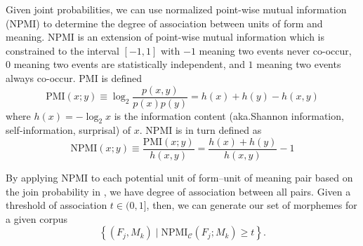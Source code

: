 

Given joint probabilities, we can use normalized point-wise mutual information (NPMI)  to determine the degree of association between units of form and meaning.
NPMI is an extension of point-wise mutual information which is constrained to the interval $[-1,1]$
  with $-1$ meaning two events never co-occur, $0$ meaning two events are statistically independent, and $1$ meaning two events always co-occur.
PMI is defined
\begin{equation}
  \text{PMI}(x;y) \equiv \log_2\frac{p(x,y)}{p(x)p(y)}
    = h(x) + h(y) - h(x,y)
\end{equation}
where $h(x)=-\log_2 x$ is the information content (aka.\@ Shannon information, self-information, surprisal) of $x$.
NPMI is in turn defined as
\begin{equation}
  \text{NPMI}(x;y) \equiv \frac{\text{PMI}(x;y)}{h(x,y)}
    = \frac{h(x)+h(y)}{h(x,y)} - 1
\end{equation}

By applying NPMI to each potential unit of form--unit of meaning pair based on the join probability in , we have degree of association between all pairs.
Given a threshold of association $t\in(0,1]$, then, we can generate our set of morphemes for a given corpus
\begin{equation}
  \left\{(F_j, M_k) \mid \text{NPMI}_{\mathcal C}(F_j; M_k) \ge t \right\}
  .
\end{equation}



